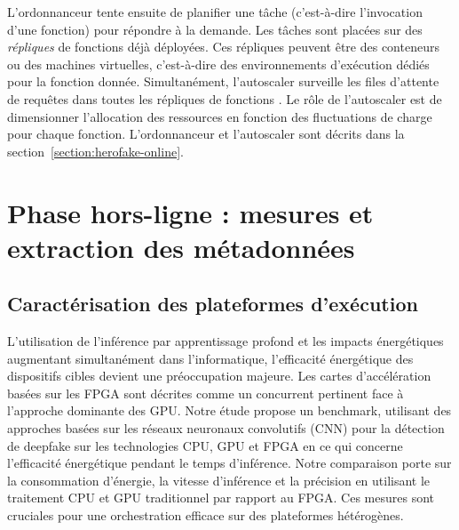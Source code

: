 L'ordonnanceur tente ensuite de planifier une tâche (c'est-à-dire l'invocation d'une fonction) pour répondre à la demande. Les tâches sont placées sur des \textit{répliques} de fonctions  déjà déployées. Ces répliques peuvent être des conteneurs ou des machines virtuelles, c'est-à-dire des environnements d'exécution dédiés pour la fonction donnée.
Simultanément, l'autoscaler surveille les files d'attente de requêtes dans toutes les répliques de fonctions . Le rôle de l'autoscaler est de dimensionner l'allocation des ressources en fonction des fluctuations de charge pour chaque fonction.
L'ordonnanceur et l'autoscaler sont décrits dans la section~\ref{section:herofake-online}.

\section{Phase hors-ligne : mesures et extraction des métadonnées}
\label{section:herofake-offline}

\subsection{Caractérisation des plateformes d'exécution}

\begin{table}[t]
\caption{Execution platform characterization}
\begin{center}
\end{center}
\label{table:herofake-platforms}
\end{table}

L'utilisation de l'inférence par apprentissage profond et les impacts énergétiques augmentant simultanément dans l'informatique, l'efficacité énergétique des dispositifs cibles devient une préoccupation majeure. Les cartes d'accélération basées sur les FPGA sont décrites comme un concurrent pertinent face à l'approche dominante des GPU. Notre étude propose un benchmark, utilisant des approches basées sur les réseaux neuronaux convolutifs (CNN) pour la détection de deepfake sur les technologies CPU, GPU et FPGA en ce qui concerne l'efficacité énergétique pendant le temps d'inférence. Notre comparaison porte sur la consommation d'énergie, la vitesse d'inférence et la précision en utilisant le traitement CPU et GPU traditionnel par rapport au FPGA. Ces mesures sont cruciales pour une orchestration efficace sur des plateformes hétérogènes.

